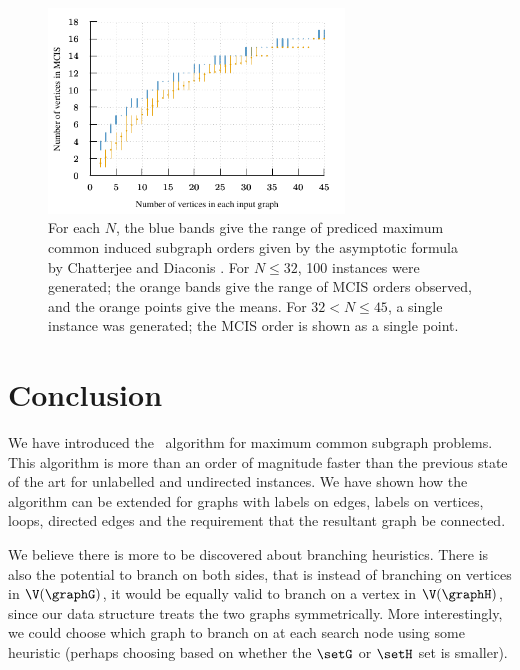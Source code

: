 \begin{figure}[htb]
    \centering
    \includegraphics*[width=0.7\textwidth]{14-mcsplit-i-undirected/data-for-diaconis-and-chatterjee/plot}
    \caption{For each $N$, the blue bands give the range of prediced maximum
    common induced subgraph orders given by the asymptotic formula by
    Chatterjee and Diaconis \cite{chatterjee2021isomorphisms}.  For $N \leq 32$,
    100 instances were generated; the orange bands give the range of MCIS orders
    observed, and the orange points give the means.  For $32 < N \leq 45$,
    a single instance was generated; the MCIS order is shown as a single point.}
    \label{figure:mcis-order-bands}
\end{figure}

\section{Conclusion}
\label{sec:mcsplit-conclusion}

We have introduced the \McSplit\ algorithm for maximum common subgraph
problems.  This algorithm is more than an order of magnitude faster than the
previous state of the art for unlabelled and undirected instances. We have
shown how the algorithm can be extended for graphs with labels on edges, labels
on vertices, loops, directed edges and the requirement that the resultant graph
be connected.

We believe there is more to be discovered about branching heuristics. There is
also the potential to branch on both sides, that is instead of branching on
vertices in $\V(\graphG)$, it would be equally valid to branch on a vertex in
$\V(\graphH)$, since our data structure treats the two graphs symmetrically. More
interestingly, we could choose which graph to branch on at each search node
using some heuristic (perhaps choosing based on whether the $\setG$ or $\setH$ set is
smaller).

